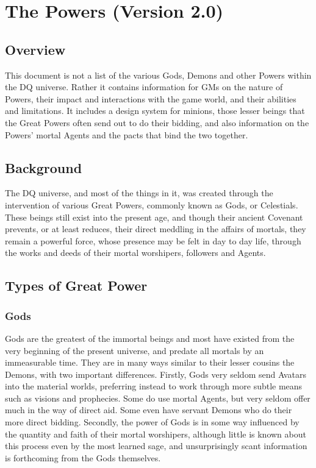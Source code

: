 \section{The Powers (Version 2.0)}

\subsection{Overview}

This document is not a list of the various Gods, Demons and other
Powers within the DQ universe. Rather it contains information for GMs
on the nature of Powers, their impact and interactions with the game
world, and their abilities and limitations. It includes a design
system for minions, those lesser beings that the Great Powers often
send out to do their bidding, and also information on the Powers'
mortal Agents and the pacts that bind the two together.

\subsection{Background}

The DQ universe, and most of the things in it, was created through the
intervention of various Great Powers, commonly known as Gods, or
Celestials. These beings still exist into the present age, and though
their ancient Covenant prevents, or at least reduces, their direct
meddling in the affairs of mortals, they remain a powerful force,
whose presence may be felt in day to day life, through the works and
deeds of their mortal worshipers, followers and Agents.

\subsection{Types of Great Power}

\subsubsection{Gods}

Gods are the greatest of the immortal beings and most have existed
from the very beginning of the present universe, and predate all
mortals by an immeasurable time. They are in many ways similar to
their lesser cousins the Demons, with two important differences.
Firstly, Gods very seldom send Avatars into the material worlds,
preferring instead to work through more subtle means such as visions
and prophecies. Some do use mortal Agents, but very seldom offer much
in the way of direct aid. Some even have servant Demons who do their
more direct bidding. Secondly, the power of Gods is in some way
influenced by the quantity and faith of their mortal worshipers,
although little is known about this process even by the most learned
sage, and unsurprisingly scant information is forthcoming from the
Gods themselves.

